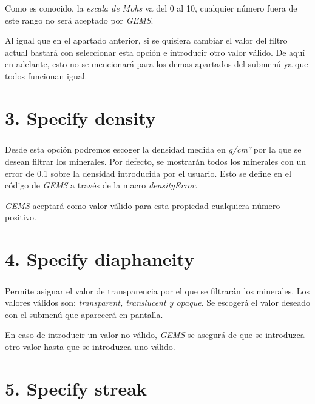 \documentclass[a4paper,10pt]{article}
\begin{document}
Como es conocido, la \textit{escala de Mohs} va del 0 al 10, cualquier número fuera de este rango no será aceptado por \textit{GEMS}.

Al igual que en el apartado anterior, si se quisiera cambiar el valor del filtro actual bastará con seleccionar esta opción e introducir otro valor válido. De aquí en adelante, esto no se mencionará para los demas apartados del submenú ya que todos funcionan igual.
\setlength{\parskip}{1em}\\

\chapter{3. Specify density}
\setlength{\parskip}{0.5em}
\paragraph{}Desde esta opción podremos escoger la densidad medida en \textit{g/cm³} por la que se desean filtrar los minerales. Por defecto, se mostrarán todos los minerales con un error de 0.1 sobre la densidad introducida por el usuario. Esto se define en el código de \textit{GEMS} a través de la macro \textit{densityError}.

\textit{GEMS} aceptará como valor válido para esta propiedad cualquiera número positivo.
\setlength{\parskip}{1em}\\

\chapter{4. Specify diaphaneity}
\setlength{\parskip}{0.5em}
\paragraph{}Permite asignar el valor de transparencia por el que se filtrarán los minerales. Los valores válidos son: \textit{transparent, translucent y opaque}. Se escogerá el valor deseado con el submenú que aparecerá en pantalla.

En caso de introducir un valor no válido, \textit{GEMS} se asegurá de que se introduzca otro valor hasta que se introduzca uno válido.
\setlength{\parskip}{1em}\\

\chapter{5. Specify streak}
\setlength{\parskip}{0.5em}
\end{document}
